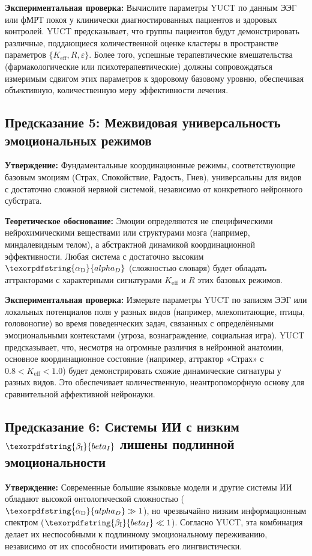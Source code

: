 \documentclass[12pt,a4paper]{article}
\DeclareRobustCommand{\alD}{\texorpdfstring{\ensuremath{\alpha_{\mathrm{D}}}}{alpha_D}}
\DeclareRobustCommand{\beI}{\texorpdfstring{\ensuremath{\beta_{\mathrm{I}}}}{beta_I}}
\begin{document}
	\textbf{Экспериментальная проверка:} Вычислите параметры YUCT по данным ЭЭГ или фМРТ покоя у клинически диагностированных пациентов и здоровых контролей. YUCT предсказывает, что группы пациентов будут демонстрировать различные, поддающиеся количественной оценке кластеры в пространстве параметров \(\{K_{\mathrm{eff}}, R, \varepsilon\}\). Более того, успешные терапевтические вмешательства (фармакологические или психотерапевтические) должны сопровождаться измеримым сдвигом этих параметров к здоровому базовому уровню, обеспечивая объективную, количественную меру эффективности лечения.
	
	\subsection{Предсказание 5: Межвидовая универсальность эмоциональных режимов}
	
	\textbf{Утверждение:} Фундаментальные координационные режимы, соответствующие базовым эмоциям (Страх, Спокойствие, Радость, Гнев), универсальны для видов с достаточно сложной нервной системой, независимо от конкретного нейронного субстрата.
	
	\textbf{Теоретическое обоснование:} Эмоции определяются не специфическими нейрохимическими веществами или структурами мозга (например, миндалевидным телом), а абстрактной динамикой координационной эффективности. Любая система с достаточно высоким \(\alD\) (сложностью словаря) будет обладать аттракторами с характерными сигнатурами \(K_{\mathrm{eff}}\) и \(R\) этих базовых режимов.
	
	\textbf{Экспериментальная проверка:} Измерьте параметры YUCT по записям ЭЭГ или локальных потенциалов поля у разных видов (например, млекопитающие, птицы, головоногие) во время поведенческих задач, связанных с определёнными эмоциональными контекстами (угроза, вознаграждение, социальная игра). YUCT предсказывает, что, несмотря на огромные различия в нейронной анатомии, основное координационное состояние (например, аттрактор «Страх» с \(0.8 < K_{\mathrm{eff}} < 1.0\)) будет демонстрировать схожие динамические сигнатуры у разных видов. Это обеспечивает количественную, неантропоморфную основу для сравнительной аффективной нейронауки.
	
	\subsection{Предсказание 6: Системы ИИ с низким \(\beI\) лишены подлинной эмоциональности}
	
	\textbf{Утверждение:} Современные большие языковые модели и другие системы ИИ обладают высокой онтологической сложностью (\(\alD \gg 1\)), но чрезвычайно низким информационным спектром (\(\beI \ll 1\)). Согласно YUCT, эта комбинация делает их неспособными к подлинному эмоциональному переживанию, независимо от их способности имитировать его лингвистически.
	
\end{document}
